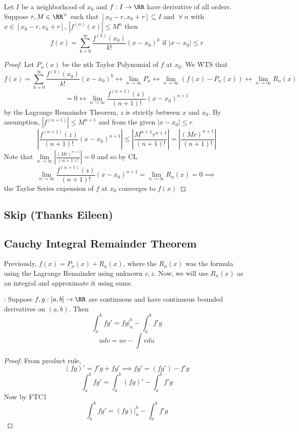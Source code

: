 \documentclass[12pt]{scrartcl}
\begin{document}
\begin{theorem}
  Let $I$ be a neighborhood of $x_0$ and $f: I \to \RR$ have derivative of all orders.  Suppose $r, M \in \RR^+$ such that $[x_0 -r, x_0 + r] \subseteq I$ and $\ \forall \ n$ with $x \in [x_0 - r, x_0 + r]$, 
  $|f^{(n)} (x)| \leq M^n$ then 
  \[f(x) = \sum_{k=0}^\infty \frac{f^{(k)}(x_0)}{k!}(x-x_0)^k \text{ if } |x-x_0| \leq r\]

  \begin{proof}
    Let $P_n(x)$ be the nth Taylor Polynomial of $f$ at $x_0$. We WTS that
    \[f(x) = \sum_{k=0}^\infty \frac{f^{(k)}(x_0)}{k!}(x-x_0)^k \leftrightarrow \lim_{n\to\infty}P_n \leftrightarrow \lim_{n\to\infty}(f(x) - P_n(x)) \leftrightarrow \lim_{n\to\infty}R_n(x)\]
    \[ = 0 \leftrightarrow \lim_{n\to\infty}\frac{f^{(n+1)}(z)}{(n+1)!}(x-x_0)^{n+1}\]
    by the Lagrange Remainder Theorem, $z$ is strictly between $x$ and $x_0$. 
    By assumption, $|f^{(n+1)}| \leq M^{n+1}$ and from the given 
    $|x-x_0| \leq r$
    \[\left| \frac{f^{(n+1)}(z)}{(n+1)!}(x-x_0)^{n+1} \right| \leq \left| \frac{M^{n+1}r^{n+1}}{(n+1)!}\right| = \left| \frac{(Mr)^{n+1}}{(n+1)!} \right|\]
    Note that $\underset{n\to\infty}{\lim}\left|\frac{(Mr)^{n+1}}{(n+1)!}\right| = 0$ and so by CL
    \[\lim_{n\to\infty}\frac{f^{(n+1)}(z)}{(n+1)!}(x-x_0)^{n+1} = \lim_{n\to\infty}R_n(x) = 0 \implies \]
    the Taylor Series expension of $f$ at $x_0$ converges to $f(x)$
  \end{proof}
\end{theorem}

\subsection{Skip (Thanks Eileen)}

\subsection{Cauchy Integral Remainder Theorem}

Previously, $f(x) = P_n(x) + R_n(x)$, where the $R_n(x)$ was the formula using the Lagrange Remainder using unknown $c, z$. 
Now, we will use $R_n(x)$ as an integral and approximate it using sums.

\begin{theorem}
  : Suppose $f, g: [a,b] \to \RR$
  are continuous and have continuous bounded derivatives on $(a,b)$. Then 
  \[\int_a^b fg' = fg|_a^b - \int_a^b f'g\]
  \[u dv = uv - \int vdu\]
  \begin{proof}
    From product rule, 
    \[(fg)' = f'g + fg' \implies fg' = (fg') - f'g\]
    \[\int_a^b fg' = \int_a^b (fg)' - \int_a^b f'g\]
    Now by FTC1
    \[\int_a^b fg' = (fg)|_a^b - \int_a^b f'g\]
  \end{proof}
\end{theorem}
\end{document}
